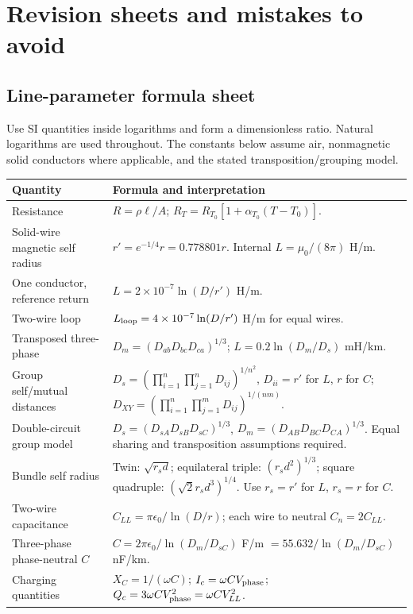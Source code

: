 \documentclass[11pt,a4paper]{article}
\newcommand{\chapterstart}[2]{\clearpage\section{#1}\label{#2}}
\begin{document}
\chapterstart{Revision sheets and mistakes to avoid}{revision}
\subsection{Line-parameter formula sheet}
Use SI quantities inside logarithms and form a dimensionless ratio. Natural logarithms are used throughout. The constants below assume air, nonmagnetic solid conductors where applicable, and the stated transposition/grouping model.
\begin{center}\small
\begin{tabularx}{\textwidth}{L{.37\textwidth}Y}
\toprule Quantity & Formula and interpretation\\\midrule
Resistance & $R=\rho\ell/A$; $R_T=R_{T_0}[1+\alpha_{T_0}(T-T_0)]$.\\
Solid-wire magnetic self radius & $r'=e^{-1/4}r=0.778801r$. Internal $L=\mu_0/(8\pi)$ H/m.\\
One conductor, reference return & $L=2\times10^{-7}\ln(D/r')$ H/m.\\
Two-wire loop & $L_{\rm loop}=4\times10^{-7}\ln(D/r')$ H/m for equal wires.\\
Transposed three-phase & $D_m=(D_{ab}D_{bc}D_{ca})^{1/3}$; $L=0.2\ln(D_m/D_s)$ mH/km.\\
Group self/mutual distances & $D_s=(\prod_{i=1}^n\prod_{j=1}^nD_{ij})^{1/n^2}$, $D_{ii}=r'$ for $L$, $r$ for $C$; $D_{XY}=(\prod_{i=1}^n\prod_{j=1}^mD_{ij})^{1/(nm)}$.\\
Double-circuit group model & $D_s=(D_{sA}D_{sB}D_{sC})^{1/3}$, $D_m=(D_{AB}D_{BC}D_{CA})^{1/3}$. Equal sharing and transposition assumptions required.\\
Bundle self radius & Twin: $\sqrt{r_s d}$; equilateral triple: $(r_s d^2)^{1/3}$; square quadruple: $(\sqrt2r_s d^3)^{1/4}$. Use $r_s=r'$ for $L$, $r_s=r$ for $C$.\\
Two-wire capacitance & $C_{LL}=\pi\epsilon_0/\ln(D/r)$; each wire to neutral $C_n=2C_{LL}$.\\
Three-phase phase-neutral $C$ & $C=2\pi\epsilon_0/\ln(D_m/D_{sC})$ F/m $=55.632/\ln(D_m/D_{sC})$ nF/km.\\
Charging quantities & $X_C=1/(\omega C)$; $I_c=\omega CV_{\rm phase}$; $Q_c=3\omega C V_{\rm phase}^2=\omega CV_{LL}^2$.\\\bottomrule
\end{tabularx}\end{center}
\end{document}
